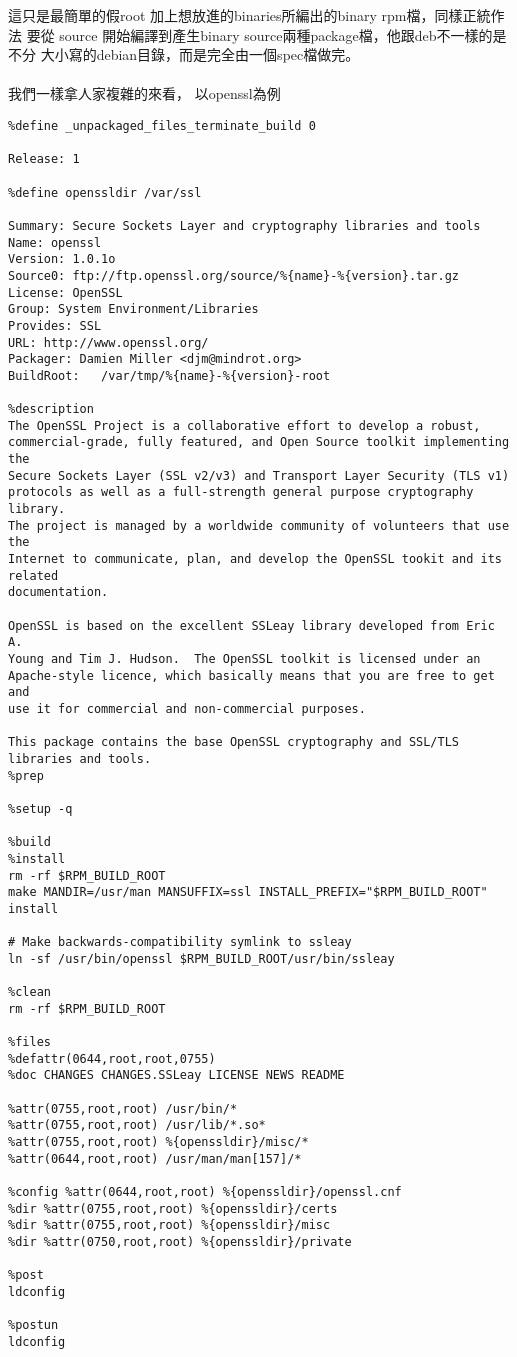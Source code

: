   這只是最簡單的假root 加上想放進的binaries所編出的binary rpm檔，同樣正統作法
  要從 source 開始編譯到產生binary source兩種package檔，他跟deb不一樣的是不分
  大小寫的debian目錄，而是完全由一個spec檔做完。
  \\\\
  我們一樣拿人家複雜的來看， 以openssl為例
\begin{verbatim}
%define _unpackaged_files_terminate_build 0

Release: 1

%define openssldir /var/ssl

Summary: Secure Sockets Layer and cryptography libraries and tools
Name: openssl
Version: 1.0.1o
Source0: ftp://ftp.openssl.org/source/%{name}-%{version}.tar.gz
License: OpenSSL
Group: System Environment/Libraries
Provides: SSL
URL: http://www.openssl.org/
Packager: Damien Miller <djm@mindrot.org>
BuildRoot:   /var/tmp/%{name}-%{version}-root

%description
The OpenSSL Project is a collaborative effort to develop a robust,
commercial-grade, fully featured, and Open Source toolkit implementing the
Secure Sockets Layer (SSL v2/v3) and Transport Layer Security (TLS v1)
protocols as well as a full-strength general purpose cryptography library.
The project is managed by a worldwide community of volunteers that use the
Internet to communicate, plan, and develop the OpenSSL tookit and its related
documentation.

OpenSSL is based on the excellent SSLeay library developed from Eric A.
Young and Tim J. Hudson.  The OpenSSL toolkit is licensed under an
Apache-style licence, which basically means that you are free to get and
use it for commercial and non-commercial purposes.

This package contains the base OpenSSL cryptography and SSL/TLS
libraries and tools.
%prep

%setup -q

%build
%install
rm -rf $RPM_BUILD_ROOT
make MANDIR=/usr/man MANSUFFIX=ssl INSTALL_PREFIX="$RPM_BUILD_ROOT" install

# Make backwards-compatibility symlink to ssleay
ln -sf /usr/bin/openssl $RPM_BUILD_ROOT/usr/bin/ssleay

%clean
rm -rf $RPM_BUILD_ROOT

%files
%defattr(0644,root,root,0755)
%doc CHANGES CHANGES.SSLeay LICENSE NEWS README

%attr(0755,root,root) /usr/bin/*
%attr(0755,root,root) /usr/lib/*.so*
%attr(0755,root,root) %{openssldir}/misc/*
%attr(0644,root,root) /usr/man/man[157]/*

%config %attr(0644,root,root) %{openssldir}/openssl.cnf
%dir %attr(0755,root,root) %{openssldir}/certs
%dir %attr(0755,root,root) %{openssldir}/misc
%dir %attr(0750,root,root) %{openssldir}/private

%post
ldconfig

%postun
ldconfig
\end{verbatim}
